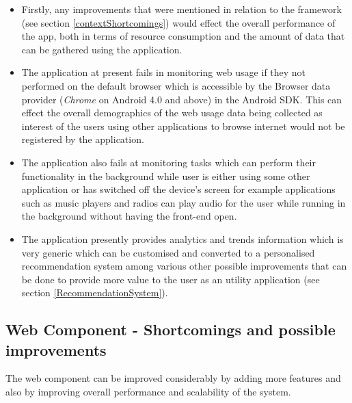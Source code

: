 \documentclass[12pt]{report}
\begin{document}
\begin{itemize}

\item Firstly, any improvements that were mentioned in relation to the framework (see section \ref{contextShortcomings}) would effect the overall performance of the app, both in terms of resource consumption and the amount of data that can be gathered using the application.

\item The application at present fails in monitoring web usage if they not performed on the default browser which is accessible by the Browser data provider (\textit{Chrome} on Android 4.0 and above) in the Android SDK. This can effect the overall demographics of the web usage data being collected as interest of the users using other applications to browse internet would not be registered by the application.

\item The application also fails at monitoring tasks which can perform their functionality in the background while user is either using some other application or has switched off the device's screen for example applications such as music players and radios can play audio for the user while running in the background without having the front-end open.

\item The application presently provides analytics and trends information which is very generic which can be customised and converted to a personalised recommendation system among various other possible improvements that can be done to provide more value to the user as an utility application (see section \ref{RecommendationSystem}).
\end{itemize}

\subsection{Web Component - Shortcomings and possible improvements}

The web component can be improved considerably by adding more features and also by improving overall performance and scalability of the system.
\end{document}
